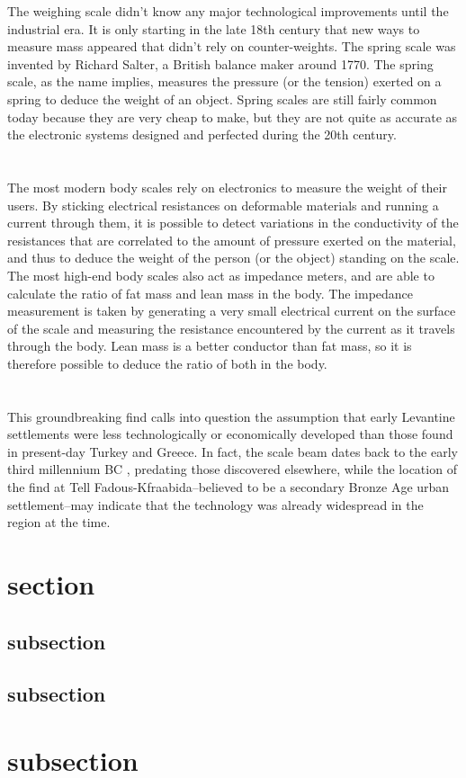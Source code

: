 The weighing scale didn’t know any major technological improvements until the industrial era. It is only starting in the late 18th century that new ways to measure mass appeared that didn’t rely on counter-weights. The spring scale was invented by Richard Salter, a British balance maker around 1770. The spring scale, as the name implies, measures the pressure (or the tension) exerted on a spring to deduce the weight of an object. Spring scales are still fairly common today because they are very cheap to make, but they are not quite as accurate as the electronic systems designed and perfected during the 20th century.
\\
\\
\\

The most modern body scales rely on electronics to measure the weight of their users. By sticking electrical resistances on deformable materials and running a current through them, it is possible to detect variations in the conductivity of the resistances that are correlated to the amount of pressure exerted on the material, and thus to deduce the weight of the person (or the object) standing on the scale. The most high-end body scales also act as impedance meters, and are able to calculate the ratio of fat mass and lean mass in the body. The impedance measurement is taken by generating a very small electrical current on the surface of the scale and measuring the resistance encountered by the current as it travels through the body. Lean mass is a better conductor than fat mass, so it is therefore possible to deduce the ratio of both in the body.
\\
\\
\\

This groundbreaking find calls into question the assumption that early Levantine settlements were less technologically or economically developed than those found in present-day Turkey and Greece. In fact, the scale beam dates back to the early third millennium BC , predating those discovered elsewhere, while the location of the find at Tell Fadous-Kfraabida–believed to be a secondary Bronze Age urban settlement–may indicate that the technology was already widespread in the region at the time.

\section{section}
\subsection{subsection}
\subsection{subsection}
\section{subsection}
